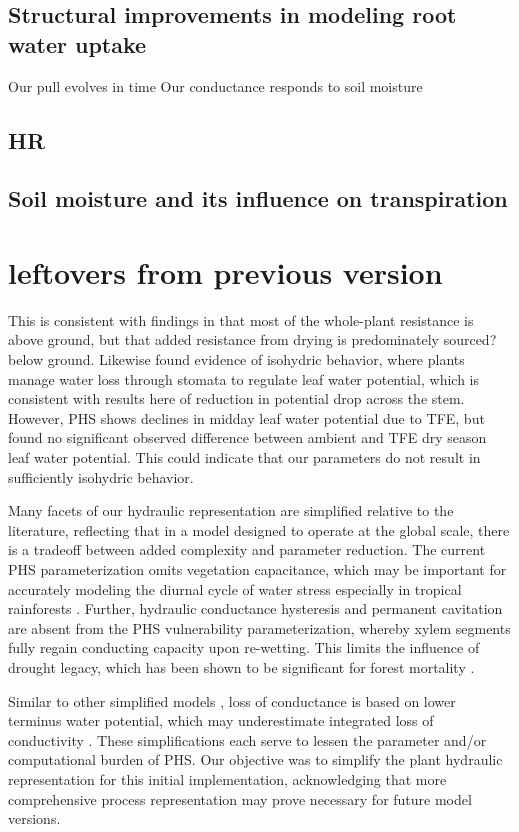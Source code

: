 \documentclass[draft,linenumbers]{agujournal}
\begin{document}
\subsection{Structural improvements in modeling root water uptake}
Our pull evolves in time
Our conductance responds to soil moisture
\subsection{HR}
\subsection{Soil moisture and its influence on transpiration}

    
\section{leftovers from previous version}
    
 This is consistent with findings in \cite{fisher2006} that most of the whole-plant resistance is above ground, but that added resistance from drying is predominately sourced? below ground. Likewise \cite{fisher2006} found evidence of isohydric behavior, where plants manage water loss through stomata to regulate leaf water potential, which is consistent with results here of reduction in potential drop across the stem. However, PHS shows declines in midday leaf water potential due to TFE, but \cite{fisher2006} found no significant observed difference between ambient and TFE dry season leaf water potential. This could indicate that our parameters do not result in sufficiently isohydric behavior.
    
    Many facets of our hydraulic representation are simplified relative to the literature, reflecting that in a model designed to operate at the global scale,  there is a tradeoff between added complexity and parameter reduction. The current PHS parameterization omits vegetation capacitance,  which may be important for accurately modeling the diurnal cycle of water stress especially in tropical rainforests \citep{meinzer2009}. Further, hydraulic conductance hysteresis and permanent cavitation are absent from the PHS vulnerability parameterization, whereby xylem segments fully regain conducting capacity upon re-wetting. This limits the influence of drought legacy, which has been shown to be significant for forest mortality \citep{anderegg2013}.
    
    Similar to other simplified models \citep{xu2016}, loss of conductance is based on lower terminus water potential, which may underestimate integrated loss of conductivity \citep{sperry2015}. These simplifications each serve to lessen the parameter and/or computational burden of PHS. Our objective was to simplify the plant hydraulic representation for this initial implementation, acknowledging that more comprehensive process representation may prove necessary for future model versions.
\end{document}
